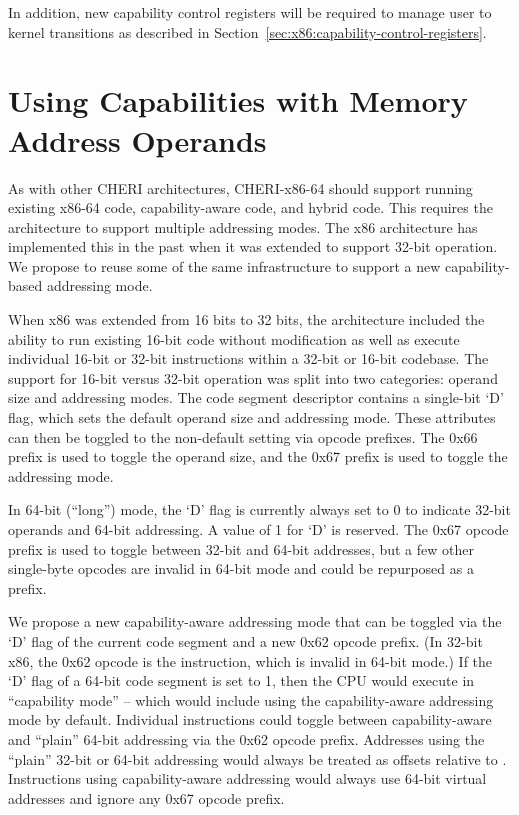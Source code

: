 In addition, new capability control registers will be required to
manage user to kernel transitions as described in
Section~\ref{sec:x86:capability-control-registers}.

\section{Using Capabilities with Memory Address Operands}

As with other CHERI architectures, CHERI-x86-64 should support running existing
x86-64 code, capability-aware code, and hybrid code.  This
requires the architecture to support multiple addressing modes.
The x86 architecture has implemented this in the past when it was
extended to support 32-bit operation.  We propose to reuse some of the
same infrastructure to support a new capability-based addressing
mode.

When x86 was extended from 16 bits to 32 bits, the architecture
included the ability to run existing 16-bit code without modification
as well as execute individual 16-bit or 32-bit instructions within a
32-bit or 16-bit codebase.  The support for 16-bit versus 32-bit
operation was
split into two categories: operand size and addressing modes.  The
code segment descriptor contains a single-bit `D' flag, which sets the
default operand size and addressing mode.  These attributes can then
be toggled to the non-default setting via opcode prefixes.  The 0x66
prefix is used to toggle the operand size, and the 0x67 prefix is used
to toggle the addressing mode.

In 64-bit (``long'') mode, the `D' flag is currently always set to
0 to indicate 32-bit operands and 64-bit addressing.  A value of
1 for `D' is reserved.  The 0x67 opcode prefix is used to toggle
between 32-bit and 64-bit addresses, but a few other single-byte opcodes
are invalid in 64-bit mode and could be repurposed as a prefix.

We propose a new capability-aware addressing mode that can be
toggled via the `D' flag of the current code segment and a new 0x62
opcode prefix.  (In 32-bit x86, the 0x62 opcode is the
 instruction, which is invalid in 64-bit mode.)
If the `D' flag of a 64-bit code segment is set to 1,
then the CPU would execute in ``capability mode'' -- which would include
using the capability-aware addressing mode by default.  Individual
instructions could toggle between capability-aware and ``plain''
64-bit addressing via the 0x62 opcode prefix.  Addresses using the
``plain'' 32-bit or 64-bit addressing would always be treated as offsets
relative to \DDC{}.  Instructions using capability-aware addressing
would always use 64-bit virtual addresses and ignore any 0x67 opcode
prefix.

